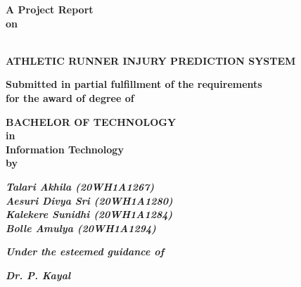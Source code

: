 \documentclass[12pt, English]{article}
\begin{document}
\begin{titlepage}

\begin{center}
\vspace*{-1in}

\begin{Large}
\vspace*{0.1in}
\textbf{A Project Report\\on}
\end{Large}
\vspace*{0.0in}
\textbf{\Large \\ ATHLETIC RUNNER INJURY PREDICTION SYSTEM}

\begin{large}
\textbf{{Submitted in partial fulfillment of the requirements \\
for the award of degree of}}\\
\end{large}
\begin{large}
{\textbf{BACHELOR OF TECHNOLOGY \\ in\\ Information Technology\\by}}\\
\end{large}

\textit{\textbf{\large Talari Akhila (20WH1A1267)}} \\
\textit{\textbf{\large Aesuri Divya Sri (20WH1A1280)}} \\
\textit{\textbf{\large Kalekere Sunidhi (20WH1A1284)}} \\
\textit{\textbf{\large Bolle Amulya (20WH1A1294)}} \\
\begin{large}
\textit{\textbf{Under the esteemed guidance of}}\\
\end{large}
\textbf{\large \textit {Dr. P. Kayal }}\\


\end{center}
\end{titlepage}
\end{document}

